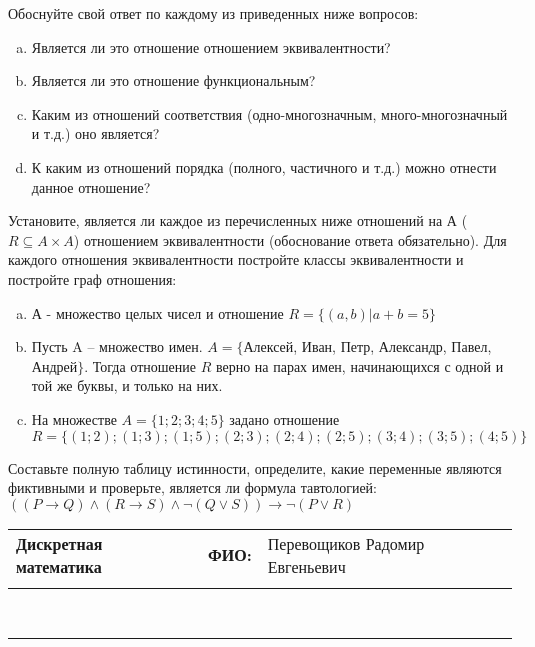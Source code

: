 \documentclass[10pt]{exam}
\newcommand{\class}{Дискретная математика}
\newcommand{\examdate}{}
\begin{document}
\begin{questions}
Обоснуйте свой ответ по каждому из приведенных ниже вопросов:
\begin{enumerate} [a)]\setcounter{enumi}{0}
    \item Является ли это отношение отношением эквивалентности?
    \item Является ли это отношение функциональным?
    \item Каким из отношений соответствия (одно-многозначным, много-многозначный и т.д.) оно является?
    \item К каким из отношений порядка (полного, частичного и т.д.) можно отнести данное отношение?
\end{enumerate}
\question
Установите, является ли каждое из перечисленных ниже отношений на А ($R \subseteq A \times A$) отношением эквивалентности (обоснование ответа обязательно). Для каждого отношения эквивалентности постройте классы 
эквивалентности и постройте граф отношения:
\begin{enumerate} [a)]\setcounter{enumi}{0}
\item А - множество целых чисел и отношение $R = \{(a,b)|a + b = 5\}$
\item Пусть A – множество имен. $A = \{ $Алексей, Иван, Петр, Александр, Павел, Андрей$ \}$. Тогда отношение $R $ верно на парах имен, начинающихся с одной и той же буквы, и только на них.
\item На множестве $A = \{1; 2; 3; 4; 5\}$ задано отношение $R = \{(1; 2); (1; 3); (1; 5); (2; 3); (2; 4); (2; 5); (3; 4); (3; 5); (4; 5)\}$
\end{enumerate}\question Составьте полную таблицу истинности, определите, какие переменные являются фиктивными и проверьте, является ли формула тавтологией:
$((P \rightarrow Q) \land (R \rightarrow S) \land \neg (Q \lor S)) \rightarrow \neg (P \lor R)$

\end{questions}
\newpage
\begin{flushright}
\begin{tabular}{p{2.8in} r l}
\textbf{\class} & \textbf{ФИО:} &Перевощиков Радомир Евгеньевич
\\

\textbf{\examdate} &&\\
\end{tabular}\\
\end{flushright}
\rule[1ex]{\textwidth}{.1pt}
\end{document}
